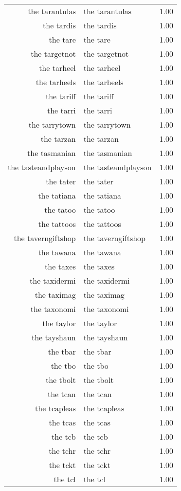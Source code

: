 \begin{table}[ht]
\begin{tabular}{rlr}
  the tarantulas & the tarantulas & 1.00 \\ 
  the tardis & the tardis & 1.00 \\ 
  the tare & the tare & 1.00 \\ 
  the targetnot & the targetnot & 1.00 \\ 
  the tarheel & the tarheel & 1.00 \\ 
  the tarheels & the tarheels & 1.00 \\ 
  the tariff & the tariff & 1.00 \\ 
  the tarri & the tarri & 1.00 \\ 
  the tarrytown & the tarrytown & 1.00 \\ 
  the tarzan & the tarzan & 1.00 \\ 
  the tasmanian & the tasmanian & 1.00 \\ 
  the tasteandplayson & the tasteandplayson & 1.00 \\ 
  the tater & the tater & 1.00 \\ 
  the tatiana & the tatiana & 1.00 \\ 
  the tatoo & the tatoo & 1.00 \\ 
  the tattoos & the tattoos & 1.00 \\ 
  the taverngiftshop & the taverngiftshop & 1.00 \\ 
  the tawana & the tawana & 1.00 \\ 
  the taxes & the taxes & 1.00 \\ 
  the taxidermi & the taxidermi & 1.00 \\ 
  the taximag & the taximag & 1.00 \\ 
  the taxonomi & the taxonomi & 1.00 \\ 
  the taylor & the taylor & 1.00 \\ 
  the tayshaun & the tayshaun & 1.00 \\ 
  the tbar & the tbar & 1.00 \\ 
  the tbo & the tbo & 1.00 \\ 
  the tbolt & the tbolt & 1.00 \\ 
  the tcan & the tcan & 1.00 \\ 
  the tcapleas & the tcapleas & 1.00 \\ 
  the tcas & the tcas & 1.00 \\ 
  the tcb & the tcb & 1.00 \\ 
  the tchr & the tchr & 1.00 \\ 
  the tckt & the tckt & 1.00 \\ 
  the tcl & the tcl & 1.00 \\ 

\end{tabular}
\end{table}
